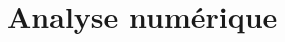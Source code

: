 \documentclass[a4paper]{article}
\begin{document}
\newpage
\section{Analyse numérique}

\newpage

\medskip


	
\end{document}
